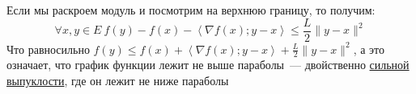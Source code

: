 

\begin{remark}

  Если мы раскроем модуль и посмотрим на верхнюю границу, то получим:
  \[
  \forall x,y \in E\ f(y) - f(x) - \left\langle \nabla f(x); y-x \right\rangle \le \frac{L}{2} \| y -x \|^2
   \]
   Что равносильно $f(y) \le f(x) + \left\langle \nabla f(x); y-x \right\rangle + \frac{L}{2} \| y-x \|^2$,
   а это означает, что график функции лежит не выше параболы~--- двойственно \hyperref[note:22E546FC-186F-4A67-85AA-2C85DCEF9021]{сильной выпуклости}, где он лежит не ниже параболы
\end{remark}

